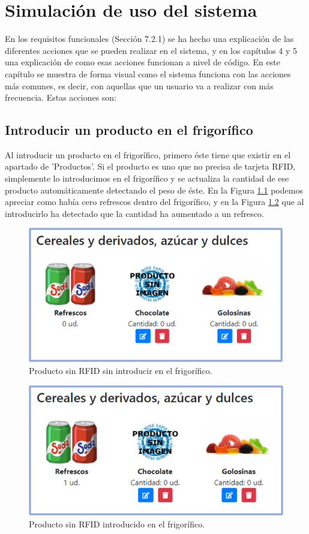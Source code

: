 \chapter{Simulación de uso del sistema}
En los requisitos funcionales (Sección 7.2.1) se ha hecho una explicación de las diferentes acciones que se pueden realizar en el sistema, y en los capítulos 4 y 5 una explicación de como esas acciones funcionan a nivel de código. En este capítulo se muestra de forma visual como el sistema funciona con las acciones más comunes, es decir, con aquellas que un usuario va a realizar con más frecuencia. Estas acciones son:

\section{Introducir un producto en el frigorífico}
Al introducir un producto en el frigorífico, primero éste tiene que existir en el apartado de 'Productos'. Si el producto es uno que no precisa de tarjeta RFID, simplemente lo introducimos en el frigorífico y se actualiza la cantidad de ese producto automáticamente detectando el peso de éste. En la Figura \ref{fig:i1} podemos apreciar como había cero refrescos dentro del frigorífico, y en la Figura \ref{fig:i2} que al introducirlo ha detectado que la cantidad ha aumentado a un refresco.

\begin{figure}[h] 
    \centering
    \includegraphics[width=.70\textwidth]{capitulos/capitulo10/introducir/1.png}
    \caption{Producto sin RFID sin introducir en el frigorífico.}
    \label{fig:i1}
\end{figure}

\begin{figure}[h] 
    \centering
    \includegraphics[width=.70\textwidth]{capitulos/capitulo10/introducir/2.png}
    \caption{Producto sin RFID introducido en el frigorífico.}
    \label{fig:i2}
\end{figure}

